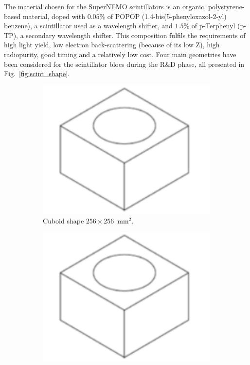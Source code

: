 The material chosen for the SuperNEMO scintillators is an organic, polystyrene-based material, doped with $0.05$\% of POPOP (1.4-bis(5-phenyloxazol-2-yl) benzene), a scintillator used as a wavelength shifter, and $1.5$\% of p-Terphenyl (p-TP), a secondary wavelength shifter.
This composition fulfils the requirements of high light yield, low electron back-scattering (because of its low Z), high radiopurity, good timing and a relatively low cost.
Four main geometries have been considered for the scintillator blocs during the R\&D phase, all presented in Fig.~\ref{fig:scint_shape}.
\begin{figure}[!h]
\centering
\begin{subfigure}[t]{0.2\textwidth}
  \centering
  \includegraphics[height=0.8\textwidth]{SNdemonstrator/fig_SNdemonstrator/square_shape.pdf}
  \captionsetup{justification=centering}
  \caption{Cuboid shape $256\times256$~mm$^{2}$.
    \label{subfig:square_shape}}
\end{subfigure}
\hfill
\begin{subfigure}[t]{0.2\textwidth}
  \centering
  \includegraphics[height=0.8\textwidth]{SNdemonstrator/fig_SNdemonstrator/square_shape.pdf}

\end{subfigure}
\end{figure}
